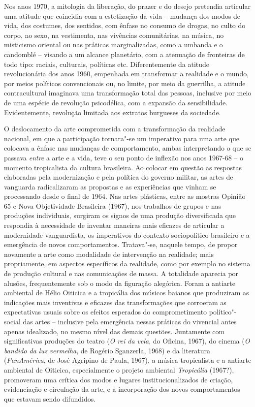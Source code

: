 Nos anos 1970, a mitologia da liberação, do prazer e do desejo pretendia
articular uma atitude que coincidia com a estetização da vida -- mudança
dos modos de vida, dos costumes, dos sentidos, com ênfase no consumo de
drogas, no culto do corpo, no sexo, na vestimenta, nas vivências
comunitárias, na música, no misticismo oriental ou nas práticas
marginalizadas, como a umbanda e o candomblé -- visando a um alcance
planetário, com a atenuação de fronteiras de todo tipo: raciais,
culturais, políticas etc. Diferentemente da atitude revolucionária dos
anos 1960, empenhada em transformar a realidade e o mundo, por meios
políticos convencionais ou, no limite, por meio da guerrilha, a atitude
contracultural imaginava uma transformação total das pessoas, inclusive
por meio de uma espécie de revolução psicodélica, com a expansão da
sensibilidade. Evidentemente, revolução limitada aos extratos burgueses
da sociedade.

O deslocamento da arte comprometida com a transformação da realidade
nacional, em que a participação tornara"-se um imperativo para uma arte
que colocava a ênfase nas mudanças de comportamento, ambas interpretando
o que se passava \emph{entre} a arte e a vida, teve o seu ponto de
inflexão nos anos 1967-68 -- o momento tropicalista da cultura
brasileira. Ao colocar em questão as respostas elaboradas pela
modernização e pela política do governo militar, as artes de vanguarda
radicalizaram as propostas e as experiências que vinham se processando
desde o final de 1964. Nas artes plásticas, entre as mostras Opinião 65
e Nova Objetividade Brasileira (1967), nos trabalhos de grupos e nas
produções individuais, surgiram os signos de uma produção diversificada
que respondia à necessidade de inventar maneiras mais eficazes de
articular a modernidade vanguardista, os imperativos do contexto
sociopolítico brasileiro e a emergência de novos comportamentos.
Tratava"-se, naquele tempo, de propor novamente a arte como modalidade de
intervenção na realidade; mais propriamente, em aspectos específicos da
realidade, como por exemplo no sistema de produção cultural e nas
comunicações de massa. A totalidade aparecia por alusões, frequentemente
sob o modo da figuração alegórica. Foram a antiarte ambiental de Hélio
Oiticica e a tropicália dos músicos baianos que produziram as indicações
mais inventivas e eficazes das transformações que corroeram as
expectativas usuais sobre os efeitos esperados do comprometimento
político"-social das artes -- inclusive pela emergência nessas práticas
do vivencial antes apenas idealizado, no mesmo nível das demais
questões. Juntamente com significativas produções do teatro (\emph{O rei
da vela}, do Oficina, 1967), do cinema (\emph{O bandido da luz
vermelha}, de Rogério Sganzerla, 1968) e da literatura
(\emph{PanAmérica}, de José Agripino de Paula, 1967), a música
tropicalista e a antiarte ambiental de Oiticica, especialmente o projeto
ambiental \emph{Tropicália} (1967?), promoveram uma crítica dos modos e
lugares institucionalizados de criação, evidenciação e circulação da
arte, e a incorporação dos novos comportamentos que estavam sendo
difundidos.

